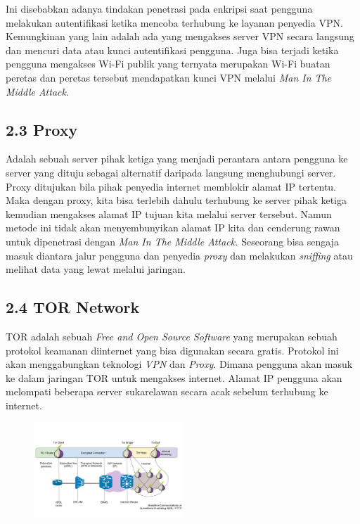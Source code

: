 \documentclass{article}
\begin{document}
        Ini disebabkan adanya tindakan penetrasi pada enkripsi saat pengguna
        melakukan autentifikasi ketika mencoba terhubung ke layanan penyedia VPN.
        Kemungkinan yang lain adalah ada yang mengakses server VPN secara langsung
        dan mencuri data atau kunci autentifikasi pengguna. Juga bisa terjadi ketika
        pengguna mengakses Wi-Fi publik yang ternyata merupakan Wi-Fi buatan peretas 
        dan peretas tersebut mendapatkan kunci VPN melalui \textit{Man In The Middle Attack}.
        \subsection*{2.3 Proxy}
        \noindent Adalah sebuah server pihak ketiga yang menjadi perantara antara
        pengguna ke server yang dituju sebagai alternatif daripada 
        langsung menghubungi server. Proxy ditujukan bila pihak penyedia
        internet memblokir alamat IP tertentu. Maka dengan proxy, kita bisa
        terlebih dahulu terhubung ke server pihak ketiga kemudian mengakses 
        alamat IP tujuan kita melalui server tersebut. Namun metode ini 
        tidak akan menyembunyikan alamat IP kita dan cenderung rawan untuk 
        dipenetrasi dengan \textit{Man In The Middle Attack.} Seseorang bisa sengaja
        masuk diantara jalur pengguna dan penyedia \textit{proxy} dan 
        melakukan \textit{sniffing} atau melihat data yang lewat melalui 
        jaringan.

        \subsection*{2.4 TOR Network}
        TOR adalah sebuah \textit{Free and Open Source Software} yang merupakan sebuah 
        protokol keamanan diinternet yang bisa digunakan secara gratis. Protokol ini akan
        menggabungkan teknologi \textit{VPN} dan \textit{Proxy}. Dimana pengguna akan masuk
        ke dalam jaringan TOR untuk mengakses internet. Alamat IP pengguna akan melompati 
        beberapa server sukarelawan secara acak sebelum terhubung ke internet.
        \begin{figure}[h]
        \includegraphics[scale=0.5, width=0.5\textwidth]{tor.jpg}
        \centering 
        \end{figure}
\end{document}

